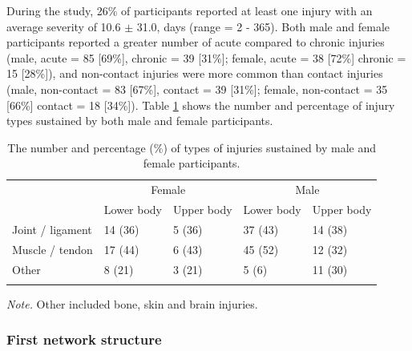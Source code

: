 \documentclass[
  english,
  man,floatsintext]{apa6}
\begin{document}
During the study, 26\% of participants reported at least one injury with an average severity of 10.6 \(\pm\) 31.0, days (range = 2 - 365).
Both male and female participants reported a greater number of acute compared to chronic injuries (male, acute = 85 {[}69\%{]}, chronic = 39 {[}31\%{]}; female, acute = 38 {[}72\%{]} chronic = 15 {[}28\%{]}), and non-contact injuries were more common than contact injuries (male, non-contact = 83 {[}67\%{]}, contact = 39 {[}31\%{]}; female, non-contact = 35 {[}66\%{]} contact = 18 {[}34\%{]}).
Table \ref{tab:injurychars} shows the number and percentage of injury types sustained by both male and female participants.

\begin{table}[H]

\begin{center}
\begin{threeparttable}

\caption{\label{tab:injurychars}The number and percentage (\%) of types of injuries sustained by male and female participants.}

\begin{tabular}{lllll}
\toprule
 & \multicolumn{2}{c}{Female} & \multicolumn{2}{c}{Male} \\
\cmidrule(r){2-3} \cmidrule(r){4-5}
 & Lower body & Upper body & Lower body & Upper body\\
\midrule
Joint / ligament & 14 (36) & 5 (36) & 37 (43) & 14 (38)\\
Muscle / tendon & 17 (44) & 6 (43) & 45 (52) & 12 (32)\\
Other & 8 (21) & 3 (21) & 5 (6) & 11 (30)\\
\bottomrule
\addlinespace
\end{tabular}

\begin{tablenotes}[para]
\normalsize{\textit{Note.} Other included bone, skin and brain injuries.}
\end{tablenotes}

\end{threeparttable}
\end{center}

\end{table}

\hypertarget{first-network-structure}{%
\subsubsection{First network structure}\label{first-network-structure}}
\end{document}

